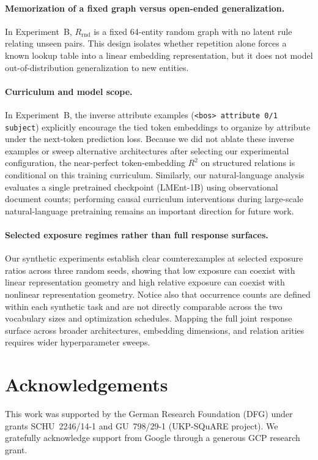 \documentclass[11pt]{article}
\newcommand{\Rrnd}{R_{\mathrm{rnd}}}
\begin{document}
\paragraph{Memorization of a fixed graph versus open-ended generalization.}
In Experiment~B, $\Rrnd$ is a fixed 64-entity random graph with no latent rule
relating unseen pairs. This design isolates whether repetition alone forces a
known lookup table into a linear embedding representation, but it does not model
out-of-distribution generalization to new entities.

\paragraph{Curriculum and model scope.}
In Experiment~B, the inverse attribute examples (\texttt{<bos> attribute 0/1
subject}) explicitly encourage the tied token embeddings to organize by
attribute under the next-token prediction loss. Because we did not ablate these
inverse examples or sweep alternative architectures after selecting our
experimental configuration, the near-perfect token-embedding $R^2$ on structured
relations is conditional on this training curriculum. Similarly, our
natural-language analysis evaluates a single pretrained checkpoint (LMEnt-1B)
using observational document counts; performing causal curriculum interventions
during large-scale natural-language pretraining remains an important direction
for future work.

\paragraph{Selected exposure regimes rather than full response surfaces.}
Our synthetic experiments establish clear counterexamples at selected exposure
ratios across three random seeds, showing that low exposure can coexist with
linear representation geometry and high relative exposure can coexist with
nonlinear representation geometry.
Notice also that occurrence counts are defined within each synthetic task and
are not directly comparable across the two vocabulary sizes and optimization
schedules. Mapping the full joint response surface across broader architectures,
embedding dimensions, and relation arities requires wider hyperparameter sweeps.

\section*{Acknowledgements}
This work was supported by the German Research Foundation (DFG) under
grants SCHU~2246/14-1 and GU~798/29-1 (UKP-SQuARE project).
We gratefully acknowledge support from Google through a generous GCP research grant.
\end{document}
